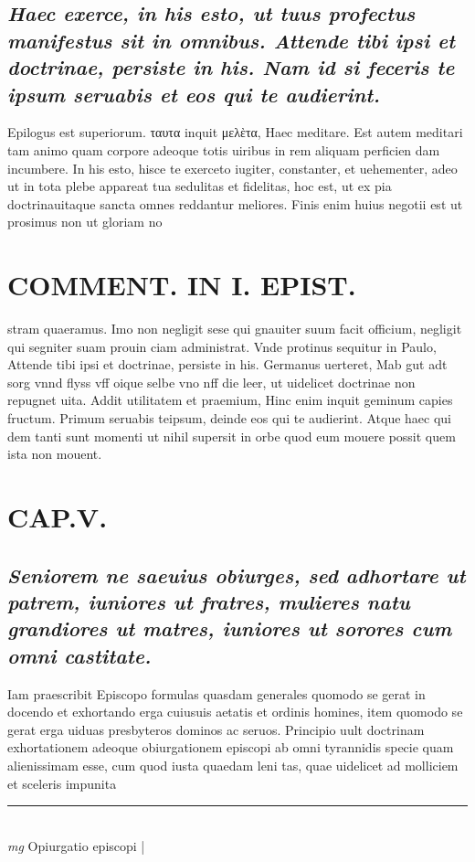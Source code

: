 \documentclass{article}
\begin{document}
\begin{pages}
\subsection*{\textit{Haec exerce, in his esto, ut tuus profectus manifestus sit in omnibus. Attende tibi ipsi et doctrinae, persiste in his. Nam id si feceris te ipsum seruabis et eos qui te audierint. }}\pstart Epilogus est superiorum. ταυτα inquit μελὲτα, Haec meditare. Est autem meditari tam animo quam corpore adeoque totis uiribus in rem aliquam perficien dam incumbere. In his esto, hisce te exerceto iugiter, constanter, et uehementer, adeo ut in tota plebe appareat tua sedulitas et fidelitas, hoc est, ut ex pia doctrinauitaque sancta omnes reddantur meliores. Finis enim huius negotii est ut prosimus non ut gloriam no  \pend
\section*{COMMENT. IN I. EPIST. }\pstart stram quaeramus. Imo non negligit sese qui gnauiter suum facit officium, negligit qui segniter suam prouin ciam administrat. Vnde protinus sequitur in Paulo, Attende tibi ipsi et doctrinae, persiste in his. Germanus uerteret, Mab gut adt sorg vnnd flyss vff oique selbe vno nff die leer, ut uidelicet doctrinae non repugnet uita. Addit utilitatem et praemium, Hinc enim inquit geminum capies fructum. Primum seruabis teipsum, deinde eos qui te audierint. Atque haec qui dem tanti sunt momenti ut nihil supersit in orbe quod eum mouere possit quem ista non mouent.  \pend
\endnumbering\beginnumbering\section{CAP.V.}
{}
\subsection*{\textit{Seniorem ne saeuius obiurges, sed adhortare ut patrem, iuniores ut fratres, mulieres natu grandiores ut matres, iuniores ut sorores cum omni castitate. }}\pstart Iam praescribit Episcopo formulas quasdam generales quomodo se gerat in docendo et exhortando erga cuiusuis aetatis et ordinis homines, item quomodo se gerat erga uiduas presbyteros dominos ac seruos. Principio uult doctrinam exhortationem adeoque  obiurgationem episcopi ab omni tyrannidis specie quam alienissimam esse, cum quod iusta quaedam leni tas, quae uidelicet ad molliciem et sceleris impunita\pend
\vspace{0.5cm}\noindent
\vspace{0.2cm}\rule{1cm}{0.2pt}\\ 
\hspace{0.2cm}\textit{mg}
\footnotesize Opiurgatio episcopi 
\normalsize| 

\end{pages}
\end{document}
